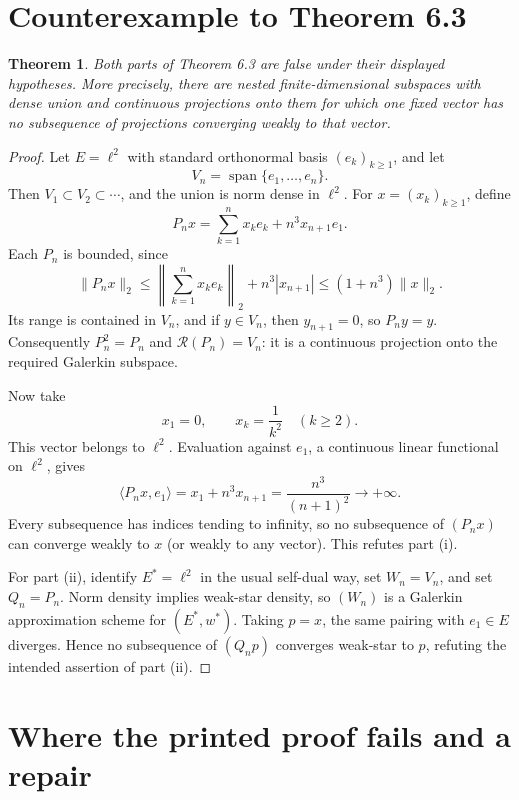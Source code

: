 \documentclass[11pt]{article}
\newtheorem{theorem}{Theorem}
\newcommand{\ellTwo}{\ell^2}
\begin{document}
\section{Counterexample to Theorem 6.3}

\begin{theorem}
Both parts of Theorem 6.3 are false under their displayed hypotheses.
More precisely, there are nested finite-dimensional subspaces with dense
union and continuous projections onto them for which one fixed vector has no
subsequence of projections converging weakly to that vector.
\end{theorem}

\begin{proof}
Let \(E=\ellTwo\) with standard orthonormal basis \((e_k)_{k\ge1}\), and let
\[
  V_n=\operatorname{span}\{e_1,\ldots,e_n\}.
\]
Then \(V_1\subset V_2\subset\cdots\), and the union is norm dense in
\(\ellTwo\).  For \(x=(x_k)_{k\ge1}\), define
\[
  P_nx=\sum_{k=1}^{n}x_ke_k+n^3x_{n+1}e_1.
  \tag{1}
\]
Each \(P_n\) is bounded, since
\[
  \|P_nx\|_2
  \le \left\|\sum_{k=1}^{n}x_ke_k\right\|_2+n^3|x_{n+1}|
  \le (1+n^3)\|x\|_2.
\]
Its range is contained in \(V_n\), and if \(y\in V_n\), then
\(y_{n+1}=0\), so \(P_ny=y\).  Consequently
\(P_n^2=P_n\) and \(\mathcal R(P_n)=V_n\): it is a continuous projection
onto the required Galerkin subspace.

Now take
\[
  x_1=0,\qquad x_k=\frac1{k^2}\quad(k\ge2).
\]
This vector belongs to \(\ellTwo\).  Evaluation against \(e_1\), a
continuous linear functional on \(\ellTwo\), gives
\[
  \langle P_nx,e_1\rangle
  =x_1+n^3x_{n+1}
  =\frac{n^3}{(n+1)^2}\longrightarrow+\infty.
\]
Every subsequence has indices tending to infinity, so no subsequence of
\((P_nx)\) can converge weakly to \(x\) (or weakly to any vector).  This
refutes part (i).

For part (ii), identify \(E^*=\ellTwo\) in the usual self-dual way, set
\(W_n=V_n\), and set \(Q_n=P_n\).  Norm density implies weak-star density,
so \((W_n)\) is a Galerkin approximation scheme for \((E^*,w^*)\).  Taking
\(p=x\), the same pairing with \(e_1\in E\) diverges.  Hence no subsequence
of \((Q_np)\) converges weak-star to \(p\), refuting the intended assertion
of part (ii).
\end{proof}

\section{Where the printed proof fails and a repair}
\end{document}
